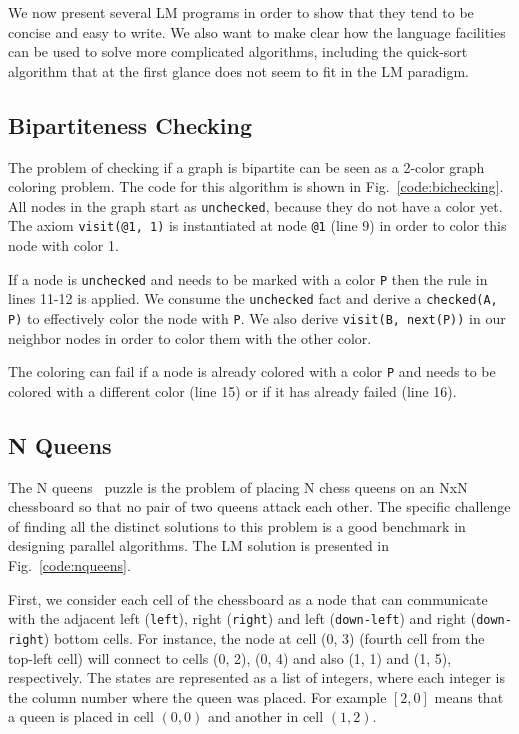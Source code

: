 
We now present several LM programs in order to show that they tend to be concise and
easy to write. We also want to make clear how the language facilities can be used to solve more
complicated algorithms, including the quick-sort algorithm that at the first glance does not seem
to fit in the LM paradigm.

\subsection{Bipartiteness Checking}

The problem of checking if a graph is bipartite can be seen as a 2-color graph coloring problem.
The code for this algorithm is shown in Fig.~\ref{code:bichecking}. All nodes in the graph
start as \texttt{unchecked}, because they do not have a color yet. The axiom \texttt{visit(@1, 1)} is
instantiated at node \texttt{@1} (line 9) in order to color this node with color 1.

If a node is \texttt{unchecked} and needs to be marked with a color \texttt{P} then the rule in
lines 11-12 is applied. We consume the \texttt{unchecked} fact and derive a \texttt{checked(A, P)}
to effectively color the node with \texttt{P}. We also derive \texttt{visit(B, next(P))} in
our neighbor nodes in order to color them with the other color.

The coloring can fail if a node is already colored with a color \texttt{P} and needs to be colored
with a different color (line 15) or if it has already failed (line 16).

\subsection{N Queens}

The N queens~\cite{8queens} puzzle is the problem of placing N chess queens on an NxN chessboard so
that no pair of two queens attack each other. The specific challenge of finding all the distinct
solutions to this problem is a good benchmark in designing parallel algorithms. The LM solution is presented
in Fig.~\ref{code:nqueens}.

First, we consider each cell of the chessboard as a node
that can communicate with the adjacent left (\texttt{left}), right (\texttt{right}) and left (\texttt{down-left}) and right (\texttt{down-right}) bottom cells.
For instance, the node at cell (0, 3) (fourth cell from the top-left cell) will connect
to cells (0, 2), (0, 4) and also (1, 1) and (1, 5), respectively.
The states are represented as a list of integers, where each integer is the column number where
the queen was placed. For example $[2, 0]$ means that a queen is placed in cell $(0, 0)$ and another in cell $(1, 2)$.

